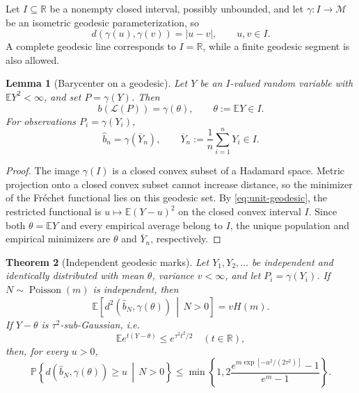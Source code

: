 \documentclass[11pt,a4paper]{article}
\newtheorem{theorem}{Theorem}[section]
\newtheorem{lemma}[theorem]{Lemma}
\theoremstyle{remark}
\newcommand{\R}{\mathbb R}
\newcommand{\M}{\mathcal M}
\newcommand{\EE}{\mathbb E}
\newcommand{\PP}{\mathbb P}
\begin{document}
Let \(I\subseteq\R\) be a nonempty closed interval, possibly unbounded, and let \(\gamma:I\to\M\) be an isometric geodesic parameterization, so
\begin{equation}
\label{eq:unit-geodesic}
 d(\gamma(u),\gamma(v))=|u-v|,
 \qquad u,v\in I.
\end{equation}
A complete geodesic line corresponds to \(I=\R\), while a finite geodesic segment is also allowed.

\begin{lemma}[Barycenter on a geodesic]
\label{lem:geodesic-barycenter}
Let \(Y\) be an \(I\)-valued random variable with \(\EE Y^2<\infty\), and set \(P=\gamma(Y)\).  Then
\begin{equation}
\label{eq:geodesic-pop-bary}
 b(\mathcal L(P))=\gamma(\theta),
 \qquad \theta:=\EE Y\in I.
\end{equation}
For observations \(P_i=\gamma(Y_i)\),
\begin{equation}
\label{eq:geodesic-emp-bary}
 \widehat b_n=\gamma(\overline Y_n),
 \qquad \overline Y_n:=\frac1n\sum_{i=1}^nY_i\in I.
\end{equation}
\end{lemma}

\begin{proof}
The image \(\gamma(I)\) is a closed convex subset of a Hadamard space.  Metric projection onto a closed convex subset cannot increase distance, so the minimizer of the Fr\'echet functional lies on this geodesic set.  By \eqref{eq:unit-geodesic}, the restricted functional is \(u\mapsto\EE(Y-u)^2\) on the closed convex interval \(I\).  Since both \(\theta=\EE Y\) and every empirical average belong to \(I\), the unique population and empirical minimizers are \(\theta\) and \(\overline Y_n\), respectively.
\end{proof}

\begin{theorem}[Independent geodesic marks]
\label{thm:iid-geodesic}
Let \(Y_1,Y_2,\ldots\) be independent and identically distributed with mean \(\theta\), variance \(v<\infty\), and let \(P_i=\gamma(Y_i)\).  If \(N\sim\operatorname{Poisson}(m)\) is independent, then
\begin{equation}
\label{eq:iid-geodesic-risk}
 \EE\!\left[d^2\!\left(\widehat b_N,\gamma(\theta)\right)\,\middle|\,N>0\right]
 =vH(m).
\end{equation}
If \(Y-\theta\) is \(\tau^2\)-sub-Gaussian, i.e.
\[
 \EE e^{t(Y-\theta)}\le e^{\tau^2t^2/2}\quad(t\in\R),
\]
then, for every \(u>0\),
\begin{equation}
\label{eq:iid-geodesic-tail}
 \PP\!\left\{d\!\left(\widehat b_N,\gamma(\theta)\right)\ge u\,\middle|\,N>0\right\}
 \le\min\!\left\{1,
 2\frac{e^{m\exp[-u^2/(2\tau^2)]}-1}{e^m-1}
 \right\}.
\end{equation}
\end{theorem}
\end{document}
